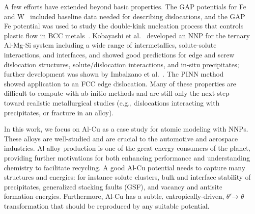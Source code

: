 \documentclass{article}
\begin{document}
A few efforts have extended beyond basic properties.  The GAP potentials for Fe~\cite{Dragoni2018AchievingIron} and W~\cite{Szlachta2014AccuracyTungsten} included baseline data needed for describing dislocations, and the GAP Fe potential was used to study the double-kink nucleation process that controls plastic flow in BCC metals~\cite{Maresca2018}.
Kobayashi et al.~\cite{Kobayashi2017} developed an NNP for the ternary Al-Mg-Si system including a wide range of intermetallics, solute-solute interactions, and interfaces, and showed good predictions for edge and screw dislocation structures, solute/dislocation interactions, and in-situ precipitates; further development was shown by Imbalzano et al.~\cite{Imbalzano2018}.
The PINN method ~\cite{PurjaPun0PhysicallyMaterials} showed application to an FCC edge dislocation.
Many of these properties are difficult to compute with ab-initio methods and are still only the next step toward realistic metallurgical studies (e.g., dislocations interacting with precipitates, or fracture in an alloy).



In this work, we focus on Al-Cu as a case study for atomic modeling with NNPs. These alloys are well-studied \cite{Preston1938StructureAlloys} and are crucial to the automotive and aerospace industries\cite{Nie2014PhysicalAlloys}.  Al alloy production is one of the great energy consumers of the planet\cite{Raabe2019StrategiesMetals}, providing further motivations for both enhancing performance and understanding chemistry to facilitate recycling.  A good Al-Cu potential needs to capture many structures and energies: for instance solute clusters, bulk and interface stability of precipitates, generalized stacking faults (GSF), and vacancy and antisite formation energies. Furthermore, Al-Cu has a subtle, entropically-driven,  $\theta'$→ $\theta$ transformation \cite{Wolverton2001b} that should be reproduced by any suitable potential.
\end{document}
